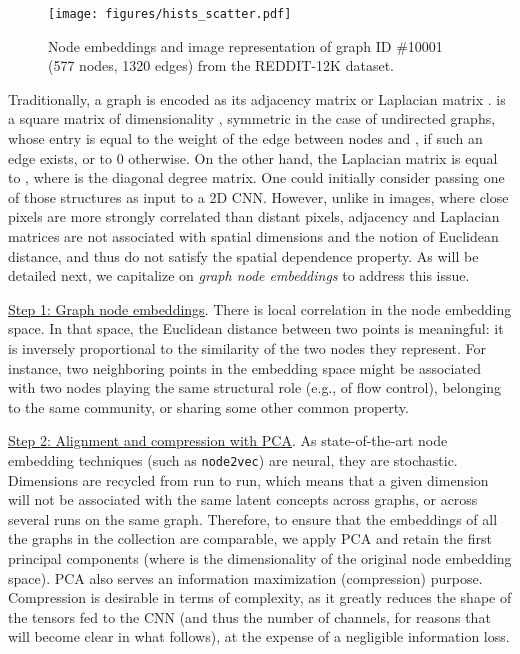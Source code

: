 \documentclass[runningheads]{llncs}
\begin{document}
\vspace{-0.2cm}

\begin{figure*}[h]
  \centering
    \texttt{[image: figures/hists\_scatter.pdf]}
\captionsetup{justification=justified,singlelinecheck=false, size=small}
    \caption{Node embeddings and image representation of graph ID \#10001 (577 nodes, 1320 edges) from the REDDIT-12K dataset.}
    \label{fig:hist_scatter}
\end{figure*}

\vspace{-0.4cm}

Traditionally, a graph  is encoded as its adjacency matrix  or Laplacian matrix .  is a square matrix of dimensionality , symmetric in the case of undirected graphs, whose  entry  is equal to the weight of the edge  between nodes  and , if such an edge exists, or to 0 otherwise. On the other hand, the Laplacian matrix  is equal to , where  is the diagonal degree matrix. One could initially consider passing one of those structures as input to a 2D CNN. However, unlike in images, where close pixels are more strongly correlated than distant pixels, adjacency and Laplacian matrices are not associated with spatial dimensions and the notion of Euclidean distance, and thus do not satisfy the spatial dependence property. As will be detailed next, we capitalize on \textit{graph node embeddings} to address this issue.

\underline{Step 1: Graph node embeddings}. There is local correlation in the node embedding space. In that space, the Euclidean distance between two points is meaningful: it is inversely proportional to the similarity of the two nodes they represent. For instance, two neighboring points in the embedding space might be associated with two nodes playing the same structural role (e.g., of flow control), belonging to the same community, or sharing some other common property.

\underline{Step 2: Alignment and compression with PCA}. As state-of-the-art node embedding techniques (such as \texttt{node2vec}) are neural, they are stochastic. Dimensions are recycled from run to run, which means that a given dimension will not be associated with the same latent concepts across graphs, or across several runs on the same graph. Therefore, to ensure that the embeddings of all the graphs in the collection are comparable, we apply PCA and retain the first  principal components (where  is the dimensionality of the original node embedding space). PCA also serves an information maximization (compression) purpose. Compression is desirable in terms of complexity, as it greatly reduces the shape of the tensors fed to the CNN (and thus the number of channels, for reasons that will become clear in what follows), at the expense of a negligible information loss.
\end{document}
